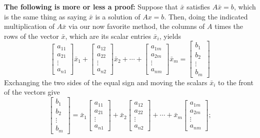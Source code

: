 \documentclass[letterpaper]{book}
\begin{document}
\textbf{The following is more or less a proof:} Suppose that $\bar{x}$ satisfies $A \bar{x} =b$, which is the same thing as saying $\bar{x}$ is a solution of $Ax=b$. Then, doing the indicated multiplication of $A \bar{x}$ via our now favorite method, the columns of $A$ times the rows of the vector $\bar{x}$, which are its scalar entries $\bar{x}_i$, yields
\begin{equation}
    \label{eq:bIsLinearCombinationColumnsA02}
\begin{bmatrix} a_{11} \\ a_{21}\\ \vdots \\ a_{n1} \end{bmatrix} \bar{x}_1 +  \begin{bmatrix} a_{12} \\ a_{22}\\ \vdots \\ a_{n2} \end{bmatrix} \bar{x}_2 + \cdots + \begin{bmatrix} a_{1m} \\ a_{2m}\\ \vdots \\ a_{nm} \end{bmatrix} \bar{x}_m = \begin{bmatrix} b_1 \\ b_2\\ \vdots \\ b_m \end{bmatrix}
\end{equation}
Exchanging the two sides of the equal sign and moving the scalars $\bar{x}_i$ to the front of the vectors give
\begin{equation}
    \label{eq:bIsLinearCombinationColumnsAflipped}
 \begin{bmatrix} b_1 \\ b_2\\ \vdots \\ b_m \end{bmatrix} = \bar{x}_1 \begin{bmatrix} a_{11} \\ a_{21}\\ \vdots \\ a_{n1} \end{bmatrix}+ \bar{x}_2 \begin{bmatrix} a_{12} \\ a_{22}\\ \vdots \\ a_{n2} \end{bmatrix} + \cdots + \bar{x}_m \begin{bmatrix} a_{1m} \\ a_{2m}\\ \vdots \\ a_{nm} \end{bmatrix};
\end{equation}
\end{document}
